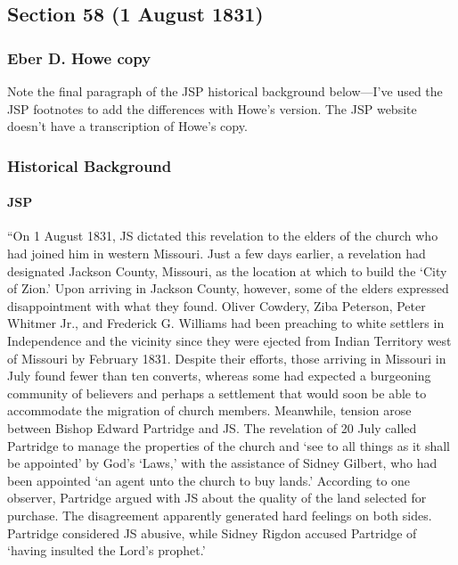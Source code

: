 \subsection{Section 58 (1 August 1831)}
	\label{DC58}
	
	\subsubsection{Eber D. Howe copy}
	
		Note the final paragraph of the JSP historical background below---I've used the JSP footnotes to add the differences with Howe's version. The JSP website doesn't have a transcription of Howe's copy.
		
	\subsubsection{Historical Background}
		\label{DC58-HB}
		
		\paragraph{JSP}
		
			``On 1 August 1831, JS dictated this revelation to the elders of the church who had joined him in western Missouri. Just a few days earlier, a revelation had designated Jackson County, Missouri, as the location at which to build the `City of Zion.' Upon arriving in Jackson County, however, some of the elders expressed disappointment with what they found. Oliver Cowdery, Ziba Peterson, Peter Whitmer Jr., and Frederick G. Williams had been preaching to white settlers in Independence and the vicinity since they were ejected from Indian Territory west of Missouri by February 1831. Despite their efforts, those arriving in Missouri in July found fewer than ten converts, whereas some had expected a burgeoning community of believers and perhaps a settlement that would soon be able to accommodate the migration of church members. Meanwhile, tension arose between Bishop Edward Partridge and JS. The revelation of 20 July called Partridge to manage the properties of the church and `see to all things as it shall be appointed' by God's `Laws,' with the assistance of Sidney Gilbert, who had been appointed `an agent unto the church to buy lands.' According to one observer, Partridge argued with JS about the quality of the land selected for purchase. The disagreement apparently generated hard feelings on both sides. Partridge considered JS abusive, while Sidney Rigdon accused Partridge of `having insulted the Lord's prophet.'
			
